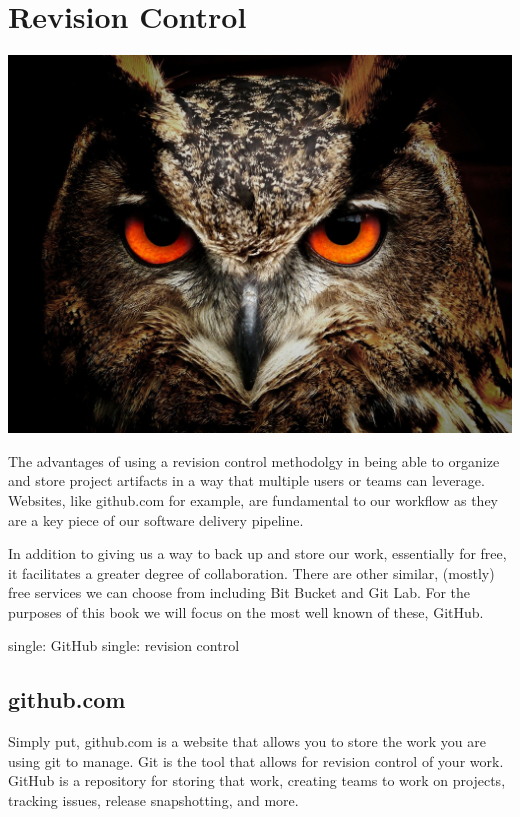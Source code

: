 \makeatletter
{}
\renewcommand{\thefigure}{\thechapter.\@arabic\c@figure}
\makeatother

\hypertarget{revision-control}{%
\section{Revision Control}\label{revision-control}}

\includegraphics{../images/owl-50267_1920.jpg}

The advantages of using a revision control methodolgy in being able to
organize and store project artifacts in a way that multiple users or
teams can leverage. Websites, like github.com for example, are
fundamental to our workflow as they are a key piece of our software
delivery pipeline.

In addition to giving us a way to back up and store our work,
essentially for free, it facilitates a greater degree of collaboration.
There are other similar, (mostly) free services we can choose from
including Bit Bucket and Git Lab. For the purposes of this book we will
focus on the most well known of these, GitHub.

single: GitHub single: revision control

\hypertarget{github.com}{%
\subsection{github.com}\label{github.com}}

Simply put, github.com is a website that allows you to store the work
you are using git to manage. Git is the tool that allows for revision
control of your work. GitHub is a repository for storing that work,
creating teams to work on projects, tracking issues, release
snapshotting, and more.

